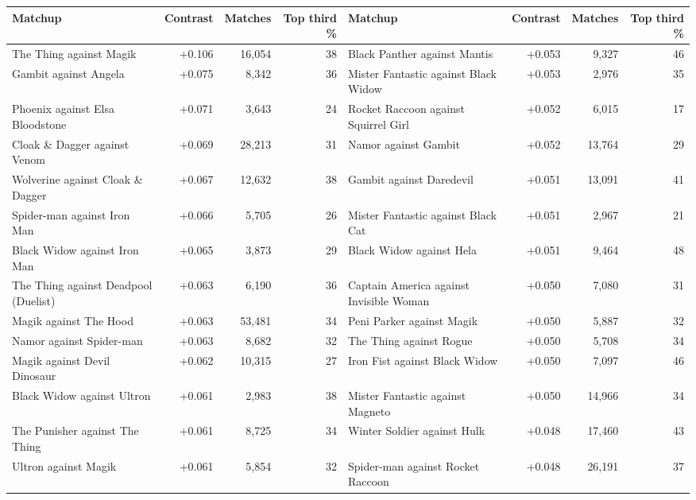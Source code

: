 \documentclass[11pt]{article}
\renewcommand{\arraystretch}{1.06}
\begin{document}
\begin{landscape}
\begin{center}
{\footnotesize\setlength{\tabcolsep}{3.5pt}\renewcommand{\arraystretch}{1.0}
\label{tab:opp}
\begin{tabular}{l r r r @{\hspace{2em}} l r r r}
\toprule
Matchup & Contrast & Matches & Top third \% & Matchup & Contrast & Matches & Top third \% \\
\midrule
The Thing against Magik & +0.106 & 16,054 & 38 & Black Panther against Mantis & +0.053 & 9,327 & 46 \\
Gambit against Angela & +0.075 & 8,342 & 36 & Mister Fantastic against Black Widow & +0.053 & 2,976 & 35 \\
Phoenix against Elsa Bloodstone & +0.071 & 3,643 & 24 & Rocket Raccoon against Squirrel Girl & +0.052 & 6,015 & 17 \\
Cloak \& Dagger against Venom & +0.069 & 28,213 & 31 & Namor against Gambit & +0.052 & 13,764 & 29 \\
Wolverine against Cloak \& Dagger & +0.067 & 12,632 & 38 & Gambit against Daredevil & +0.051 & 13,091 & 41 \\
Spider-man against Iron Man & +0.066 & 5,705 & 26 & Mister Fantastic against Black Cat & +0.051 & 2,967 & 21 \\
Black Widow against Iron Man & +0.065 & 3,873 & 29 & Black Widow against Hela & +0.051 & 9,464 & 48 \\
The Thing against Deadpool (Duelist) & +0.063 & 6,190 & 36 & Captain America against Invisible Woman & +0.050 & 7,080 & 31 \\
Magik against The Hood & +0.063 & 53,481 & 34 & Peni Parker against Magik & +0.050 & 5,887 & 32 \\
Namor against Spider-man & +0.063 & 8,682 & 32 & The Thing against Rogue & +0.050 & 5,708 & 34 \\
Magik against Devil Dinosaur & +0.062 & 10,315 & 27 & Iron Fist against Black Widow & +0.050 & 7,097 & 46 \\
Black Widow against Ultron & +0.061 & 2,983 & 38 & Mister Fantastic against Magneto & +0.050 & 14,966 & 34 \\
The Punisher against The Thing & +0.061 & 8,725 & 34 & Winter Soldier against Hulk & +0.048 & 17,460 & 43 \\
Ultron against Magik & +0.061 & 5,854 & 32 & Spider-man against Rocket Raccoon & +0.048 & 26,191 & 37 \\

\end{tabular}}
\end{center}
\end{landscape}
\end{document}
